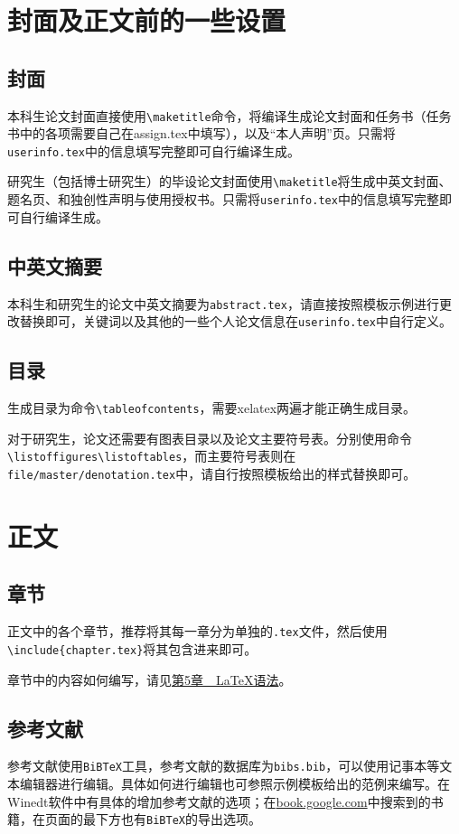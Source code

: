 \section{封面及正文前的一些设置}
\subsection{封面}
本科生论文封面直接使用\texttt{\textbackslash maketitle}命令，将编译生成论文封面和任务书（任务书中的各项需要自己在assign.tex中填写），以及“本人声明”页。只需将\texttt{userinfo.tex}中的信息填写完整即可自行编译生成。

研究生（包括博士研究生）的毕设论文封面使用\texttt{\textbackslash maketitle}将生成中英文封面、题名页、和独创性声明与使用授权书。只需将\texttt{userinfo.tex}中的信息填写完整即可自行编译生成。

\subsection{中英文摘要}
本科生和研究生的论文中英文摘要为\texttt{abstract.tex}，请直接按照模板示例进行更改替换即可，关键词以及其他的一些个人论文信息在\texttt{userinfo.tex}中自行定义。
\subsection{目录}
生成目录为命令\texttt{\textbackslash tableofcontents}，需要xelatex两遍才能正确生成目录。

对于研究生，论文还需要有图表目录以及论文主要符号表。分别使用命令\texttt{\textbackslash listoffigures}\texttt{\textbackslash listoftables}，而主要符号表则在\texttt{file/master/denotation.tex}中，请自行按照模板给出的样式替换即可。

\section{正文}
\subsection{章节}
正文中的各个章节，推荐将其每一章分为单独的\texttt{.tex}文件，然后使用\texttt{\textbackslash include\{chapter.tex\}}将其包含进来即可。

章节中的内容如何编写，请见\hyperref[chapter-yufa]{第5章~~\LaTeX{}语法}。

\subsection{参考文献}
参考文献使用\texttt{BiBTeX}工具，参考文献的数据库为\texttt{bibs.bib}，可以使用记事本等文本编辑器进行编辑。具体如何进行编辑也可参照示例模板给出的范例来编写。在Winedt软件中有具体的增加参考文献的选项；在\url{book.google.com}中搜索到的书籍，在页面的最下方也有\texttt{BiBTeX}的导出选项。

